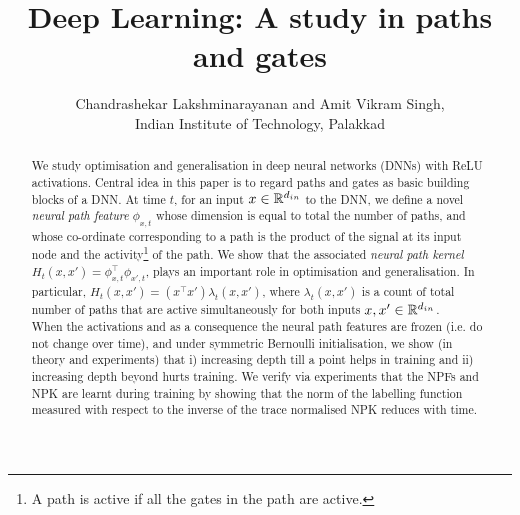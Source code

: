 \documentclass{article}
\title{Deep Learning: A study in paths and gates}
\author{Chandrashekar Lakshminarayanan and Amit Vikram Singh, \\ Indian Institute of Technology, Palakkad}
\begin{document}
\maketitle
\begin{abstract}
We study optimisation and generalisation in deep neural networks (DNNs) with ReLU activations. Central idea in this paper is to regard paths and gates as basic building blocks of a DNN. At time $t$, for an input $x\in\mathbb{R}^{d_{in}}$ to the DNN, we define a novel \emph{neural path feature} $\phi_{x,t}$ whose dimension is equal to total the number of paths, and whose co-ordinate corresponding to a path is the product of the signal at its input node  and the activity\footnote{A path is active if all the gates in the path are active.} of the path. We show that the associated \emph{neural path kernel} $H_t(x,x')=\phi^\top_{x,t}\phi_{x',t}$, plays an important role in optimisation and generalisation. In particular, $H_t(x,x')=(x^\top x')\lambda_t(x,x')$, where $\lambda_t(x,x')$ is a count of total number of paths that are active simultaneously for both inputs $x,x'\in \mathbb{R}^{d_{in}}$. \hfill\\
When the activations and as a consequence the neural path features are frozen (i.e. do not change over time), and under symmetric Bernoulli initialisation, we show (in theory and experiments) that i) increasing depth till a point helps in training and ii) increasing depth beyond hurts training. We verify via experiments that the NPFs and NPK are learnt during training by showing that the norm of the labelling function measured with respect to the inverse of the trace normalised NPK reduces with time.
\end{abstract}
\end{document}

